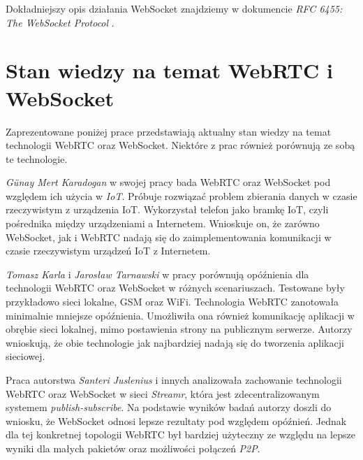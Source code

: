 \documentclass[language=polish,type=master]{aghmodern}
\begin{document}
Dokładniejszy opis działania WebSocket znajdziemy w dokumencie \emph{RFC 6455: The WebSocket Protocol} \cite{RFC6455}.

\pagebreak

\section{Stan wiedzy na temat WebRTC i WebSocket}
Zaprezentowane poniżej prace przedstawiają aktualny stan wiedzy na temat technologii WebRTC oraz WebSocket.
Niektóre z prac również porównują ze sobą te technologie.

\emph{G{\"u}nay Mert Karadogan} w swojej pracy \cite{websocket_webrtc_iot} bada WebRTC oraz WebSocket pod względem ich użycia w \emph{IoT}\footnotemark{}.
Próbuje rozwiązać problem zbierania danych w czasie rzeczywistym z urządzenia IoT.
Wykorzystał telefon jako bramkę IoT, czyli pośrednika między urządzeniami a Internetem.
Wnioskuje on, że zarówno WebSocket, jak i WebRTC nadają się do zaimplementowania komunikacji w czasie rzeczywistym urządzeń IoT z Internetem.

\emph{Tomasz Karla} i \emph{Jarosław Tarnawski} w pracy \cite{websocket_webrtc_realtime} porównują opóźnienia dla technologii WebRTC oraz WebSocket w różnych scenariuszach.
Testowane były przykładowo sieci lokalne, GSM oraz WiFi. Technologia WebRTC zanotowała minimalnie mniejsze opóźnienia.
Umożliwiła ona również komunikację aplikacji w obrębie sieci lokalnej\footnotemark{}, mimo postawienia strony na publicznym serwerze.
Autorzy wnioskują, że obie technologie jak najbardziej nadają się do tworzenia aplikacji sieciowej.

Praca \cite{websocket_webrtc_streamr} autorstwa \emph{Santeri Juslenius} i innych analizowała zachowanie technologii WebRTC oraz WebSocket w sieci \emph{Streamr}, która jest zdecentralizowanym systemem \emph{publish-subscribe}\footnotemark{}.
Na podstawie wyników badań autorzy doszli do wniosku, że WebSocket odnosi lepsze rezultaty pod względem opóźnień.
Jednak dla tej konkretnej topologii WebRTC był bardziej użyteczny ze względu na lepsze wyniki dla małych pakietów oraz możliwości połączeń \emph{P2P}\footnotemark{}.
\end{document}
